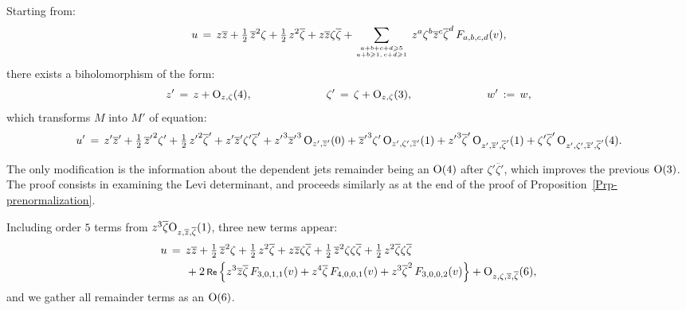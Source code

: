 \documentclass[12pt,twoside,leqno,openany]{amsart}
\begin{document}
\begin{Lemma}
Starting from:
\[
u
\,=\,
z\overline{z}
+
\tfrac{1}{2}\,
\overline{z}^2\zeta
+
\tfrac{1}{2}\,
z^2\overline{\zeta}
+
z\overline{z}\zeta\overline{\zeta}
+
\sum_{a+b+c+d\geqslant 5
\atop
a+b\geqslant 1,\,c+d\geqslant 1}\,
z^a\zeta^b\overline{z}^c\overline{\zeta}^d\,
F_{a,b,c,d}(v),
\]
there exists a biholomorphism of the form:
\[
z'
\,=\,
z
+
{\rm O}_{z,\zeta}(4),
\ \ \ \ \ \ \ \ \ \ \ \ \ \ \ \ \ \ \ \
\zeta'
\,=\,
\zeta
+
{\rm O}_{z,\zeta}(3),
\ \ \ \ \ \ \ \ \ \ \ \ \ \ \ \ \ \ \ \
w'
\,:=\,
w,
\]
which transforms $M$ into $M'$ of equation:
\[
u'
\,=\,
z'\overline{z}'
+
\tfrac{1}{2}\,{\overline{z}'}^2\zeta'
+
\tfrac{1}{2}\,{z'}^2\overline{\zeta}'
+
z'\overline{z}'\zeta'\overline{\zeta}'
+
{z'}^3{\overline{z}'}^3\,{\rm O}_{z',\overline{z}'}(0)
+
{\overline{z}'}^3\zeta'\,{\rm O}_{z',\zeta',\overline{z}'}(1)
+
{z'}^3\overline{\zeta}'\,
{\rm O}_{z',\overline{z}',\overline{\zeta}'}(1)
+
\zeta'\overline{\zeta}'\,
{\rm O}_{z',\zeta',\overline{z}',\overline{\zeta}'}(4).
\]
\end{Lemma}

\proof
The only modification is the information about the dependent jets
remainder being an ${\rm O}(4)$ after
$\zeta' \overline{\zeta}'$, which improves 
the previous ${\rm O}(3)$. The proof consists in 
examining the Levi determinant, and proceeds similarly
as at the end of the proof of
Proposition~{\ref{Prp-prenormalization}}.
\endproof

\label{normalization-F-3-0-1-1}

Including order $5$ terms from $z^3\overline{\zeta} 
{\rm O}_{z, \overline{z}, \overline{\zeta}}(1)$, three
new terms appear:
\leqnomode\usetagform{default}
\begin{align}
\label{gather-O-6}
u
&
\,=\,
z\overline{z}
+
\tfrac{1}{2}\,\overline{z}^2\zeta
+
\tfrac{1}{2}\,z^2\overline{\zeta}
+
z\overline{z}\zeta\overline{\zeta}
+
\tfrac{1}{2}\,\overline{z}^2\zeta\zeta\overline{\zeta}
+
\tfrac{1}{2}\,z^2\overline{\zeta}\zeta\overline{\zeta}
\notag
\\
&
\ \ \ \ \
+
2\,\Re\,
\Big\{
z^3\overline{z}\overline{\zeta}\,F_{3,0,1,1}(v)
+
z^4\overline{\zeta}\,F_{4,0,0,1}(v)
+
z^3\overline{\zeta}^2\,F_{3,0,0,2}(v)
\Big\}
+
{\rm O}_{z,\zeta,\overline{z},\overline{\zeta}}(6),
\end{align}
and we gather all remainder terms as an ${\rm O}(6)$.
\end{document}

